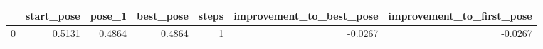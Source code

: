 \begin{tabular}{lrrrrrr}
\toprule
{} &  start\_pose &  pose\_1 &  best\_pose &  steps &  improvement\_to\_best\_pose &  improvement\_to\_first\_pose \\
\midrule
0 &      0.5131 &  0.4864 &     0.4864 &      1 &                   -0.0267 &                    -0.0267 \\
\bottomrule
\end{tabular}
